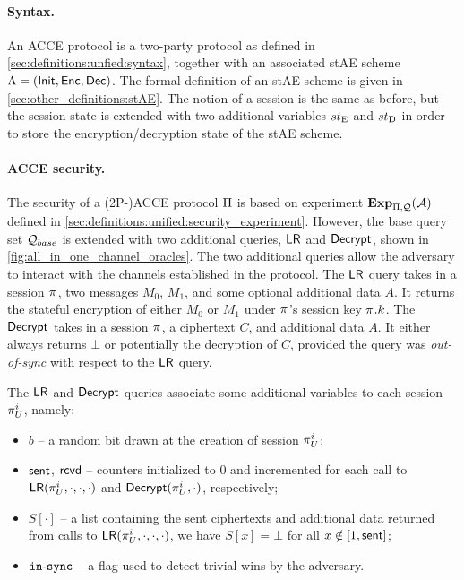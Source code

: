 \paragraph{Syntax.}
An ACCE protocol is a two-party protocol as defined in \cref{sec:definitions:unfied:syntax},
together with an associated stAE scheme
$\Lambda = (\mathsf{Init},\mathsf{Enc},\mathsf{Dec})$.
The formal definition of an stAE scheme is given in \cref{sec:other_definitions:stAE}.
The notion of a session is the same as before,
but the session state is extended with two additional variables $st_{\mathrm{E}}$ and $st_{\mathrm{D}}$ in order to store the encryption/decryption state of the stAE scheme.  




\paragraph{ACCE security.}
The security of a (2P-)ACCE protocol $\mathrm{\Pi}$ is based on experiment $\mathbf{Exp}_{\mathrm{\Pi},\mathcal{Q}}^{}(\mathcal{A})$ defined in \cref{sec:definitions:unified:security_experiment}.
However,
the base query set $\mathcal{Q}_{base}$ is extended with two additional queries,
$\mathsf{LR}$ and $\mathsf{Decrypt}$,
shown in \cref{fig:all_in_one_channel_oracles}.
The two additional queries allow the adversary to interact with the channels established in the protocol.
The $\mathsf{LR}$ query takes in a session $\oracle$, 
two messages $M_0$, $M_1$,
and some optional additional data $A$.
It returns the stateful encryption of either $M_0$ or $M_1$ under $\oracle$'s session key $\oracle.\key$.
The $\mathsf{Decrypt}$ takes in a session $\oracle$,
a ciphertext $C$,
and additional data $A$.
It either always returns $\bot$ or potentially the decryption of $C$,
provided the query was \emph{out-of-sync} with  respect to the $\mathsf{LR}$ query.

The $\mathsf{LR}$ and $\mathsf{Decrypt}$ queries associate some additional variables to each session $\oracle[U][i]$,
namely:
\begin{itemize}
	\item $b$ -- a random bit drawn at the creation of session $\oracle[U][i]$;
	
	\item $\mathsf{sent}$, $\mathsf{rcvd}$ -- counters  initialized to $0$ and incremented for each call to $\Encrypt(\oracle[U][i], \cdot, \cdot, \cdot)$ and $\Decrypt(\oracle[U][i], \cdot)$, respectively;
	
	\item $S[\cdot]$ -- a list containing the sent ciphertexts and additional data returned from calls to $\Encrypt(\oracle[U][i], \cdot, \cdot, \cdot)$,
	 we have $S[x] = \bot$ for all $x \notin [1, \mathsf{sent}]$;
	
	\item $\operatorname{\mathtt{in-sync}}$ -- a flag used to detect trivial wins by the adversary. 
	  
\end{itemize}

